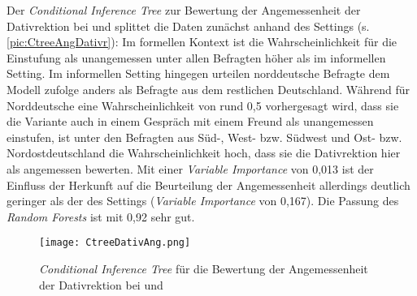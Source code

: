 Der \textit{Conditional Inference Tree} zur Bewertung der Angemessenheit der Dativrektion bei \wegen{} und \waehrend{} splittet die Daten zunächst anhand des Settings (s. \autoref{pic:CtreeAngDativr}): 
Im formellen Kontext ist die Wahrscheinlichkeit für die Einstufung als unangemessen unter allen Befragten höher als im informellen Setting. 
Im informellen Setting hingegen urteilen norddeutsche Befragte dem Modell zufolge anders als Befragte aus dem restlichen Deutschland. 
Während für Norddeutsche eine Wahrscheinlichkeit von rund 0,5 vorhergesagt wird, dass sie die Variante auch in einem Gespräch mit einem Freund als unangemessen einstufen, ist unter den Befragten aus Süd-, West- bzw. Südwest und Ost- bzw. Nordostdeutschland die Wahrscheinlichkeit hoch, dass sie die Dativrektion hier als angemessen bewerten. 
Mit einer \textit{Variable Importance} von 0,013 ist der Einfluss der Herkunft auf die Beurteilung der Angemessenheit allerdings deutlich geringer als der des Settings (\textit{Variable Importance} von 0,167). 
Die Passung des \textit{Random Forests} ist mit 0,92 sehr gut. 
\begin{figure}
\centering
\texttt{[image: CtreeDativAng.png]}
\caption{\textit{Conditional Inference Tree} für die Bewertung der Angemessenheit der Dativrektion bei \wegen{} und \waehrend}
\label{pic:CtreeAngDativr}
\end{figure}

